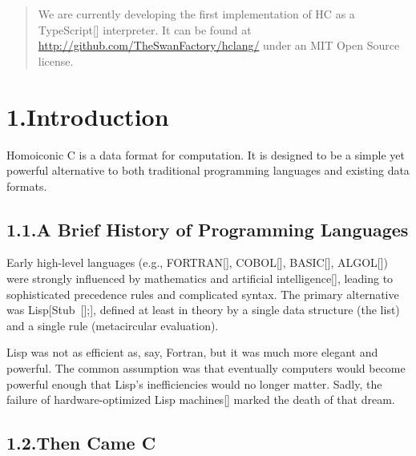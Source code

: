 \documentclass[preprint]{{sigplanconf}}
\begin{document}
\begin{abstract}
We are currently developing the first implementation of HC as a
TypeScript{}[] interpreter. It can be found at
\href{http://github.com/TheSwanFactory/hclang/}{{\ttfamily http://\hspace{0pt}github.\hspace{0pt}com/\hspace{0pt}TheSwanFactory/\hspace{0pt}hclang/\hspace{0pt}}} under an MIT Open Source
license.%
\end{abstract}%

\section{1.\hspace*{0.5em}Introduction}\label{sec-intro}%

\noindent Homoiconic C is a data format for computation. It is designed to be a
simple yet powerful alternative to both traditional programming languages
and existing data formats.%

\subsection{1.1.\hspace*{0.5em}A Brief History of Programming Languages}\label{sec-a-brief-history-of-programming-languages}%

\noindent Early high-level languages (e.g., FORTRAN{}[], COBOL{}[],
BASIC{}[], ALGOL{}[]) were strongly influenced by mathematics and artificial
intelligence{}[], leading to sophisticated precedence rules and
complicated syntax. The primary alternative was Lisp[Stub~{}[];], defined \textendash{}
at least in theory \textendash{} by a single data structure (the list) and a single
rule (metacircular evaluation).%

Lisp was not as efficient as, say, Fortran, but it was much more elegant
and powerful. The common assumption was that eventually computers would
become powerful enough that Lisp's inefficiencies would no longer matter.
Sadly, the failure of hardware-optimized Lisp machines{}[] marked the death
of that dream.%

\subsection{1.2.\hspace*{0.5em}Then Came C}\label{sec-then-came-c}%
\end{document}
